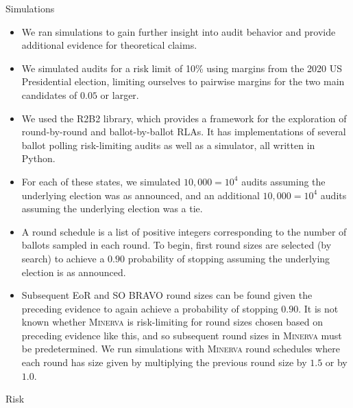 \documentclass[final]{beamer}
\newcommand{\Minerva}{\textsc{Minerva}\xspace}
\newcommand{\BRAVO}{\textsc{BRAVO}\xspace}
\newlength{\colwidth}
\begin{document}
\begin{frame}[t]
\begin{columns}[t]
\begin{column}{\colwidth}
\begin{block}{Simulations}
\begin{itemize}
\item
We ran simulations to gain further insight into audit behavior 
and provide additional evidence for theoretical claims.
\item 
We simulated audits for a risk limit of 10\% using margins
from the 2020 US Presidential election, limiting ourselves to pairwise margins
for the two main candidates of $0.05$ or larger.
\item 
We used the R2B2 library\cite{r2b2}, which provides a framework for the exploration
of round-by-round and ballot-by-ballot RLAs. It has implementations of several
ballot polling risk-limiting audits as well as a simulator, all written in Python.
\item
For each of these states, we simulated 
$10,000=10^4$ audits assuming the underlying election was as announced,  
and an additional $10,000=10^4$ audits assuming the underlying election was a tie. 
\end{itemize}
\end{block}

\begin{itemize}
\item
A round schedule is a list of positive integers corresponding to the number of ballots 
sampled in each round.
To begin, first round sizes are selected (by search) to achieve a $0.90$
probability of stopping assuming the underlying election is as announced.
\item
Subsequent EoR and SO \BRAVO round sizes can be found given the preceding evidence to 
again achieve a probability of stopping $0.90$. It is not known whether \Minerva is 
risk-limiting for round sizes chosen based on preceding evidence like this, and 
so subsequent round sizes in \Minerva must be predetermined. We run simulations with
\Minerva round schedules where each round has size given by multiplying the previous
round size by $1.5$ or by $1.0$.

\end{itemize}

\begin{block}{Risk}


\end{block}
\end{column}
\end{columns}
\end{frame}
\end{document}
